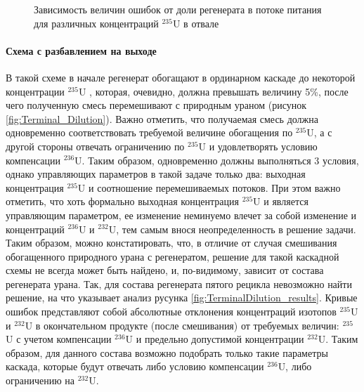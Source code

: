 \begin{figure}[ht]
  \caption{Зависимость величин ошибок от доли регенерата в потоке питания для различных концентраций $^{235}$U в отвале}\label{fig:pre}
\end{figure}


\paragraph{Схема с разбавлением на выходе}
В такой схеме в начале регенерат обогащают в ординарном каскаде до некоторой концентрации $^{235}$U , которая, очевидно, должна превышать величину 5\%, после чего полученную смесь перемешивают с природным ураном (рисунок \ref{fig:Terminal_Dilution}). Важно отметить, что получаемая смесь должна одновременно соответствовать требуемой величине обогащения по $^{235}$U, а с другой стороны отвечать ограничению по $^{235}$U и удовлетворять условию компенсации $^{236}$U. Таким образом, одновременно должны выполняться 3 условия, однако управляющих параметров в такой задаче только два: выходная концентрация $^{235}$U и соотношение перемешиваемых потоков. При этом важно отметить, что хоть формально выходная концентрация  $^{235}$U и является управляющим параметром, ее изменение неминуемо влечет за собой изменение и
концентраций $^{236}$U и $^{232}$U, тем самым внося неопределенность в решение задачи. Таким
образом, можно констатировать, что, в отличие от случая смешивания обогащенного
природного урана с регенератом, решение для такой каскадной схемы не всегда может
быть найдено, и, по-видимому, зависит от состава регенерата урана.
Так, для состава регенерата пятого рецикла невозможно найти решение, на что указывает анализ русунка \ref{fig:TerminalDilution_results}. Кривые ошибок представляют собой абсолютные отклонения концентраций изотопов $^{235}$U и $^{232}$U в окончательном продукте (после смешивания) от требуемых величин: $^{235}$U с учетом компенсации $^{236}$U и предельно допустимой концентрации $^{232}$U. Таким образом, для данного состава возможно
подобрать только такие параметры каскада, которые будут отвечать либо условию
компенсации  $^{236}$U, либо ограничению на $^{232}$U.

